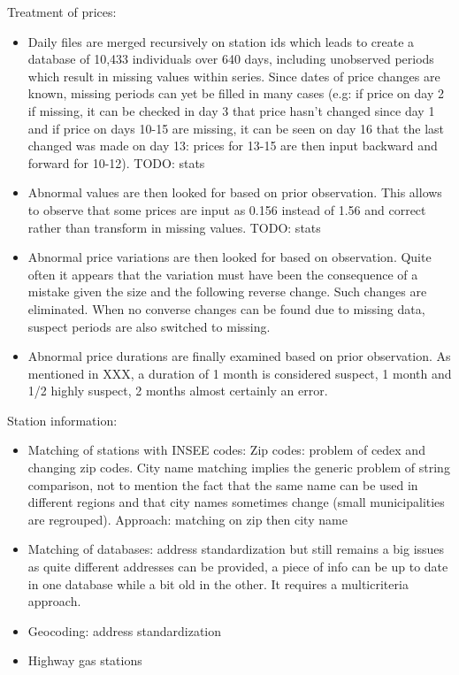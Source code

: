 \documentclass[11pt]{article}
\begin{document}
Treatment of prices:
\begin{itemize}
\item Daily files are merged recursively on station ids which leads to create a database of 10,433 individuals over 640 days, including unobserved periods which result in missing values within series. Since dates of price changes are known, missing periods can yet be filled in many cases (e.g: if price on day 2 if missing, it can be checked in day 3 that price hasn't changed since day 1 and if price on days 10-15 are missing, it can be seen on day 16 that the last changed was made on day 13: prices for 13-15 are then input backward and forward for 10-12). TODO: stats
\item Abnormal values are then looked for based on prior observation. This allows to observe that some prices are input as 0.156 instead of 1.56 and correct rather than transform in missing values. TODO: stats
\item Abnormal price variations are then looked for based on observation. Quite often it appears that the variation must have been the consequence of a mistake given the size and the following reverse change. Such changes are eliminated. When no converse changes can be found due to missing data, suspect periods are also switched to missing.
\item Abnormal price durations are finally examined based on prior observation. As mentioned in XXX, a duration of 1 month is considered suspect, 1 month and 1/2 highly suspect, 2 months almost certainly an error.
\end{itemize}

Station information:
\begin{itemize}
\item Matching of stations with INSEE codes: Zip codes: problem of cedex and changing zip codes. City name matching implies the generic problem of string comparison, not to mention the fact that the same name can be used in different regions and that city names sometimes change (small municipalities are regrouped). Approach: matching on zip then city name
\item Matching of databases: address standardization but still remains a big issues as quite different addresses can be provided, a piece of info can be up to date in one database while a bit old in the other. It requires a multicriteria approach.
\item Geocoding: address standardization
\item Highway gas stations
\end{itemize}
\end{document}
